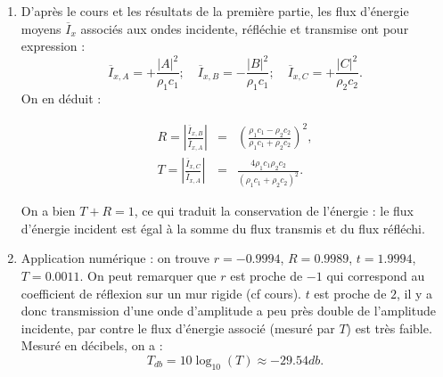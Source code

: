\documentclass[10pt, a4paper]{article}
\newcommand{\question}[1]{}
\newcommand{\answer}[1]{#1}
\begin{document}
\begin{enumerate}
\item \question{Montrez que les coefficients de réflexion et de transmission en énergie ont les expressions suivantes :}
\answer{D'après le cours et les résultats de la première partie, les flux d'énergie moyens $\overline{I}_x$ associés aux ondes incidente, réfléchie et transmise ont pour expression :
$$
\overline{I}_{x,A} = + \frac{|A|^2}{\rho_1 c_1} ; 
\quad \overline{I}_{x,B} = - \frac{|B|^2}{\rho_1 c_1} ;
\quad \overline{I}_{x,C} = + \frac{|C|^2}{\rho_2 c_2}.
$$
On en déduit :}

\begin{eqnarray}
R = \left| \frac{\overline{I}_{x,B}}{\overline{I}_{x,A}}  \right| &=& \left(\frac{\rho_1 c_1 - \rho_2 c_2}{\rho_1 c_1 + \rho_2 c_2}\right)^2,\\
T =\left| \frac{\overline{I}_{x,C}}{\overline{I}_{x,A}}  \right| &=& \frac{4 \rho_1 c_1\rho_2 c_2}{(\rho_1 c_1 + \rho_2 c_2)^2}.
\label{eq:RT}
\end{eqnarray}
\question{Vérifiez que $T+R = 1$. Quelle est l'interprétation physique de ce résultat ?}
\answer{ On a bien $T+R =1$, ce qui traduit la conservation de l'énergie : le flux  d'énergie incident est égal à la somme du flux transmis et du flux réfléchi.}

\item \question{Application numérique : donnez les valeurs de $t,r,T,R$ pour la transmission entre l'air et l'eau.
Exprimez $T$ en décibels.}
\answer{ Application numérique : on trouve 
$r = -0.9994$, $R = 0.9989$, $t=1.9994$, $T = 0.0011$.
On peut remarquer que $r$ est proche de $-1$ qui correspond au coefficient de réflexion sur un mur rigide (cf cours). $t$ est proche de $2$, il y a donc transmission d'une onde d'amplitude a peu près double de l'amplitude incidente, par contre le flux d'énergie associé (mesuré par $T$) est très faible.
Mesuré en décibels, on a : 
$$
T_{db} = 10 \log_{10} (T) \approx -29.54 db.
$$
}

\question{
\item {\em Question supplémentaire*}.
On considère maintenant, non plus un milieu infini des deux côtés de la discontinuité, mais un conduit cylindrique d'axe $\vec{e}_x$, dont la section varie brutalement entre une valeur $S_1$ (pour $x<0$) et une valeur $S_2$ (pour $x>0$). On suppose que le champ de pression reste donné par la description (\ref{eq:ABC}).

On note $q'(x,t)  = u' S$ le débit de volume à travers la section du tube.

\begin{enumerate}


\end{enumerate}}
\end{enumerate}
\end{document}
